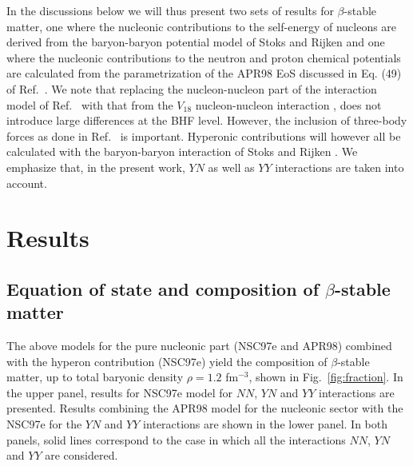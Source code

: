In the discussions below we will thus present two sets of results for
$\beta$-stable matter, one where the nucleonic contributions
to the self-energy of nucleons are derived from the baryon-baryon potential
model of Stoks  and Rijken \cite{sr99} and one where the nucleonic 
contributions to the neutron and proton chemical potentials are
calculated from the parametrization of the APR98 EoS discussed in 
Eq. (49) of  Ref.\ \cite{hh99}. We note that replacing the nucleon-nucleon 
part of the interaction model of
Ref.\ \cite{sr99} with that from the
$V_{18}$ nucleon-nucleon interaction \cite{v18}, 
does not introduce large differences at the BHF level. However,
the inclusion of three-body forces as done in Ref.\ \cite{apr98} is 
important.
Hyperonic contributions
will however all be calculated with the baryon-baryon interaction of
Stoks  and Rijken \cite{sr99}. We emphasize that, in the present work, 
$YN$ as well as $YY$ interactions are taken into account. 


\section{Results}
\label{sec:sec3}

\subsection{Equation of state and composition of $\beta$-stable matter}
\label{sec:sec3a}

The above models for the pure nucleonic part (NSC97e and APR98)
combined with the hyperon contribution (NSC97e)
yield the composition of $\beta$-stable matter, up to total
baryonic density $\rho=1.2$ fm$^{-3}$, shown in Fig.\  \ref{fig:fraction}.
In the upper panel, results for NSC97e model for $NN$, $YN$ and $YY$
interactions are presented. Results combining the APR98 model for
the nucleonic sector with the 
NSC97e for the $YN$ and $YY$ interactions are shown in the lower panel. 
In both
panels, solid lines correspond to the case in which all the interactions
$NN$, $YN$ and $YY$ are considered. 

